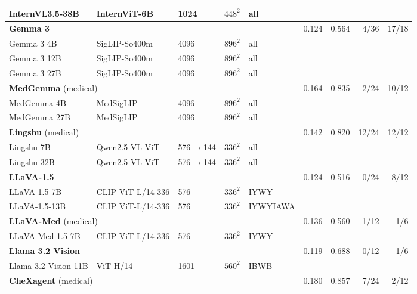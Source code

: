 \documentclass[11pt]{article}
\begin{document}
\begin{table}[tp]
{\begin{tabular}{lllll@{\hspace{8pt}}rrrr}
\quad InternVL3.5-38B & InternViT-6B & 1024 & $448^2$ & all & & & & \\
\midrule
\multicolumn{5}{l}{\textbf{Gemma 3}~\citep{gemma2025gemma3}} & 0.124 & 0.564 & \cellcolor{cfTerra2}4/36 & \cellcolor{cfTerra4}17/18 \\
\quad Gemma 3 4B & SigLIP-So400m & 4096 & $896^2$ & all & & & & \\
\quad Gemma 3 12B & SigLIP-So400m & 4096 & $896^2$ & all & & & & \\
\quad Gemma 3 27B & SigLIP-So400m & 4096 & $896^2$ & all & & & & \\
\midrule
\multicolumn{5}{l}{\textbf{MedGemma} (medical)~\citep{sellergren2025medgemma}} & 0.164 & 0.835 & \cellcolor{cfTerra2}2/24 & \cellcolor{cfTerra3}10/12 \\
\quad MedGemma 4B & MedSigLIP & 4096 & $896^2$ & all & & & & \\
\quad MedGemma 27B & MedSigLIP & 4096 & $896^2$ & all & & & & \\
\midrule
\multicolumn{5}{l}{\textbf{Lingshu} (medical)~\citep{lasa2025lingshu}} & 0.142 & 0.820 & \cellcolor{cfTerra4}12/24 & \cellcolor{cfTerra4}12/12 \\
\quad Lingshu 7B & Qwen2.5-VL ViT & 576$\to$144 & $336^2$ & all & & & & \\
\quad Lingshu 32B & Qwen2.5-VL ViT & 576$\to$144 & $336^2$ & all & & & & \\
\midrule
\multicolumn{5}{l}{\textbf{LLaVA-1.5}~\citep{liu2024improved}} & 0.124 & 0.516 & \cellcolor{cfTerra1}0/24 & \cellcolor{cfTerra3}8/12 \\
\quad LLaVA-1.5-7B & CLIP ViT-L/14-336 & 576 & $336^2$ & IYWY & & & & \\
\quad LLaVA-1.5-13B & CLIP ViT-L/14-336 & 576 & $336^2$ & IYWYIAWA & & & & \\
\midrule
\multicolumn{5}{l}{\textbf{LLaVA-Med} (medical)~\citep{li2023llavamed}} & 0.136 & 0.560 & \cellcolor{cfTerra2}1/12 & \cellcolor{cfTerra2}1/6 \\
\quad LLaVA-Med 1.5 7B & CLIP ViT-L/14-336 & 576 & $336^2$ & IYWY & & & & \\
\midrule
\multicolumn{5}{l}{\textbf{Llama 3.2 Vision}~\citep{meta2024llama32vision}} & 0.119 & 0.688 & \cellcolor{cfTerra1}0/12 & \cellcolor{cfTerra2}1/6 \\
\quad Llama 3.2 Vision 11B & ViT-H/14 & 1601 & $560^2$ & IBWB & & & & \\
\midrule
\multicolumn{5}{l}{\textbf{CheXagent} (medical)~\citep{chen2024chexagent}} & 0.180 & 0.857 & \cellcolor{cfTerra3}7/24 & \cellcolor{cfTerra2}2/12 \\

\end{tabular}}
\end{table}
\end{document}
